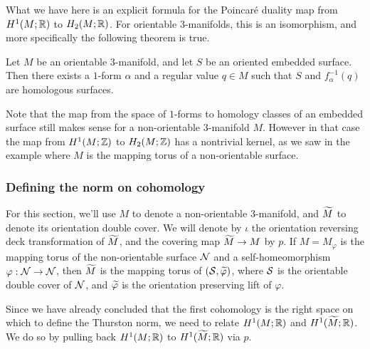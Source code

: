 What we have here is an explicit formula for the Poincar\'e duality map from $H^1(M; \mathbb{R})$ to $H_2(M; \mathbb{R})$.
For orientable $3$-manifolds, this is an isomorphism, and more specifically the following theorem is true.
\begin{thm}
  \label{thm:orientable-poincare-duality}
  Let $M$ be an orientable $3$-manifold, and let $S$ be an oriented embedded surface. Then there exists a $1$-form
  $\alpha$ and a regular value $q\in M$ such that $S$ and $f_{\alpha}^{-1}(q)$ are homologous surfaces.
\end{thm}

Note that the map from the space of $1$-forms to homology classes of an embedded surface still makes sense for a non-orientable $3$-manifold $M$.
However in that case the map from $H^1(M; \mathbb{Z})$ to $H_2(M; \mathbb{Z})$ has a nontrivial kernel, as we saw in the example where $M$ is the mapping torus of a non-orientable surface.

\subsubsection*{Defining the norm on cohomology}
For this section, we'll use $M$ to denote a non-orientable $3$-manifold, and $\widetilde{M}$ to denote its orientation double cover.
We will denote by $\iota$ the orientation reversing deck transformation
of $\widetilde{M}$, and the covering map $\widetilde{M} \to M$ by $p$.
If $M=M_\varphi$ is the mapping torus of the non-orientable surface $\mathcal{N}$ and a self-homeomorphism $\varphi: \mathcal{N} \to \mathcal{N}$, then $\widetilde{M}$ is the mapping torus of $(\mathcal{S}, \widetilde{\varphi})$, where $\mathcal{S}$ is the orientable double cover of $\mathcal{N}$, and $\widetilde{\varphi}$ is the orientation preserving lift of $\varphi$.

Since we have already concluded that the first cohomology is the right space on which to define the Thurston norm, we need to relate $H^1(M; \mathbb{R})$ and $H^1(\widetilde{M}; \mathbb{R})$. We do so by pulling back $H^1(M;\mathbb{R})$ to $H^1(\widetilde{M};\mathbb{R})$ via $p$.

